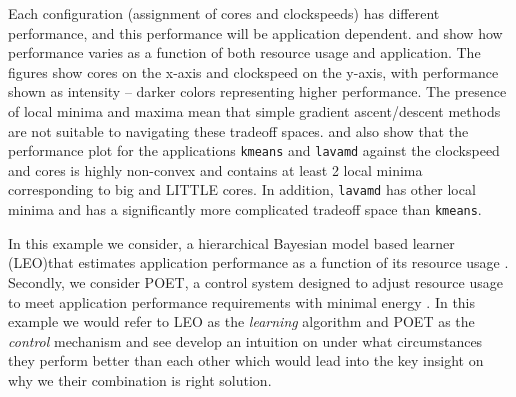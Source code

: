 Each configuration (assignment of cores and clockspeeds) has different
performance, and this performance will be application dependent.
 and  show how performance varies as a function of both
resource usage and application.  The figures show cores on the x-axis
and clockspeed on the y-axis, with performance shown as intensity --
darker colors representing higher performance. The presence of local
minima and maxima mean that simple gradient ascent/descent methods are
not suitable to navigating these tradeoff spaces.
 and  also show that the performance plot for the
applications \texttt{kmeans} and \texttt{lavamd} against the
clockspeed and cores is highly non-convex and contains at least 2 local
minima corresponding to big and LITTLE cores.  In addition,
\texttt{lavamd} has other local minima and has a significantly more
complicated tradeoff space than \texttt{kmeans}. 


In this example we consider, a hierarchical Bayesian model based learner (LEO)that estimates application performance as a function of its resource usage \cite{LEO}. Secondly, we consider POET, a control system designed to adjust resource usage to meet application performance requirements with minimal energy
\cite{POET}. In this example we would refer to LEO as the \emph{learning} algorithm and POET as the \emph{control} mechanism and see develop an intuition on under what circumstances they perform better than each other which would lead into the key insight on why we their combination is right solution.


